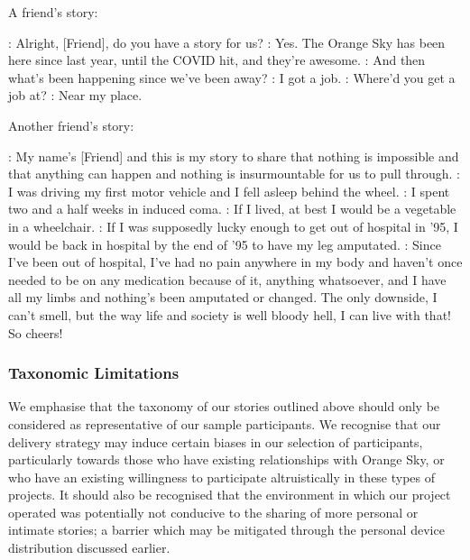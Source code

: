 \vspace{1cm}
A friend's story:

\begin{drama}

    \volspeaks: Alright, [Friend], do you have a story for us?
    \friendspeaks: Yes. The Orange Sky has been here since last year, until the COVID hit, and they're awesome.
    \volspeaks: And then what's been happening since we've been away?
    \friendspeaks: I got a job.
    \volspeaks: Where'd you get a job at?
    \friendspeaks: Near my place.
\end{drama}

\vspace{1cm}
Another friend's story:

\begin{drama}

    \friendspeaks: My name's [Friend] and this is my story to share that nothing is impossible and that anything can happen and nothing is insurmountable for us to pull through. 
    \friendspeaks: I was driving my first motor vehicle and I fell asleep behind the wheel.
    \friendspeaks: I spent two and a half weeks in induced coma. 
    \friendspeaks: If I lived, at best I would be a vegetable in a wheelchair. 
    \friendspeaks: If I was supposedly lucky enough to get out of hospital in '95, I would be back in hospital by the end of '95 to have my leg amputated. 
    \friendspeaks: Since I've been out of hospital, I've had no pain anywhere in my body and haven't once needed to be on any medication because of it, anything whatsoever, and I have all my limbs and nothing's been amputated or changed. The only downside, I can't smell, but the way life and society is well bloody hell, I can live with that! So cheers!
\end{drama}

\subsubsection{Taxonomic Limitations}

We emphasise that the taxonomy of our stories outlined above should only be considered as representative of our sample participants. We recognise that our delivery strategy may induce certain biases in our selection of participants, particularly towards those who have existing relationships with Orange Sky, or who have an existing willingness to participate altruistically in these types of projects. It should also be recognised that the environment in which our project operated was potentially not conducive to the sharing of more personal or intimate stories; a barrier which may be mitigated through the personal device distribution discussed earlier.
